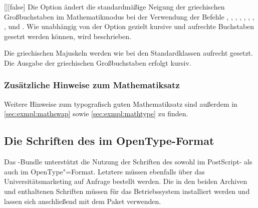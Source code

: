 \begin{Declaration*}{}
\begin{Declaration*}{}
\begin{Declaration*}{}
\begin{Declaration}{[\PBoolean]}[false]
\printdeclarationlist%
%
Die Option ändert die standardmäßige Neigung der griechischen Großbuchstaben im 
Mathematikmodus bei der Verwendung der Befehle , , 
, , , , , 
,  und . Wie unabhängig von der Option 
 gezielt kursive und aufrechte Buchstaben gesetzt werden 
können, wird  beschrieben.
%
\begin{values}
\itemfalse
  Die griechischen Majuskeln werden wie bei den Standardklassen aufrecht 
  gesetzt.
\itemtrue*
  Die Ausgabe der griechischen Großbuchstaben erfolgt kursiv.
\end{values}
\end{Declaration}


\subsubsection{Zusätzliche Hinweise zum Mathematiksatz}
Weitere Hinweise zum typografisch guten Mathematiksatz sind außerdem in 
\autoref{sec:exmpl:mathswap} sowie \autoref{sec:exmpl:mathtype} zu finden.
%
%


\subsection{Die Schriften des \CDs im OpenType-Format}
\label{sec:fonts:fontspec}
%
%
Das \TUDScript-Bundle unterstützt die Nutzung der Schriften des \CDs sowohl 
im PostScript- als auch im OpenType"=Format. Letztere müssen ebenfalls über das 
%
{Universitätsmarketing auf Anfrage} bestellt werden. Die in den beiden Archiven 
 und  enthaltenen Schriften müssen 
für das Betriebssystem installiert werden und lassen sich anschließend mit dem 
Paket  verwenden.


\end{Declaration*}
\end{Declaration*}
\end{Declaration*}
